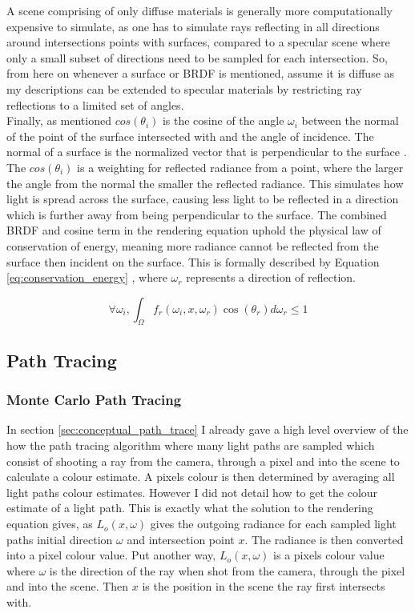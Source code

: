 \documentclass[../dissertation.tex]{subfiles}
\begin{document}
A scene comprising of only diffuse materials is generally more computationally expensive to simulate, as one has to simulate rays reflecting in all directions around intersections points with surfaces, compared to a specular scene where only a small subset of directions need to be sampled for each intersection. So, from here on whenever a surface or BRDF is mentioned, assume it is diffuse as my descriptions can be extended to specular materials by restricting ray reflections to a limited set of angles.\\

Finally, as mentioned $cos(\theta_i)$ is the cosine of the angle $\omega_i$ between the normal of the point of the surface intersected with and the angle of incidence. The normal of a surface is the normalized vector that is perpendicular to the surface \cite{normals}. The $cos(\theta_i)$ is a weighting for reflected radiance from a point, where the larger the angle from the normal the smaller the reflected radiance. This simulates how light is spread across the surface, causing less light to be reflected in a direction which is further away from being perpendicular to the surface. The combined BRDF and cosine term in the rendering equation uphold the physical law of conservation of energy, meaning more radiance cannot be reflected from the surface then incident on the surface. This is formally described by Equation \ref{eq:conservation_energy} \cite{glassner2014principles}, where $\omega_r$ represents a direction of reflection.

\begin{equation}
\forall \omega_i, \int_\Omega f_r(\omega_i, x, \omega_r) \cos(\theta_r) d\omega_r \leq 1
\label{eq:conservation_energy}
\end{equation}

\subsection{Path Tracing}

\subsubsection{Monte Carlo Path Tracing}
\label{sec:monte_carlo_path_tracing}

In section \ref{sec:conceptual_path_trace} I already gave a high level overview of the how the path tracing algorithm where many light paths are sampled which consist of shooting a ray from the camera, through a pixel and into the scene to calculate a colour estimate. A pixels colour is then determined by averaging all light paths colour estimates. However I did not detail how to get the colour estimate of a light path. This is exactly what the solution to the rendering equation gives, as $L_o(x,\omega)$ gives the outgoing radiance for each sampled light paths initial direction $\omega$ and intersection point $x$. The radiance is then converted into a pixel colour value. Put another way, $L_o(x,\omega)$ is a pixels colour value where $\omega$ is the direction of the ray when shot from the camera, through the pixel and into the scene. Then $x$ is the position in the scene the ray first intersects with. \\
\end{document}

